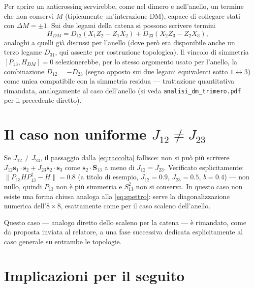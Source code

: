 \documentclass[11pt,a4paper]{article}
\begin{document}
Per aprire un anticrossing servirebbe, come nel dimero e nell'anello, un
termine che non conservi $M$ (tipicamente un'interazione DM), capace di
collegare stati con $\Delta M=\pm1$. Sui due legami della catena si possono
scrivere termini
\[
H_{DM} = D_{12}(X_1Z_2-Z_1X_2) + D_{23}(X_2Z_3-Z_2X_3),
\]
analoghi a quelli già discussi per l'anello (dove però era disponibile
anche un terzo legame $D_{31}$, qui assente per costruzione topologica).
Il vincolo di simmetria $[P_{13},H_{DM}]=0$ selezionerebbe, per lo stesso
argomento usato per l'anello, la combinazione $D_{12}=-D_{23}$ (segno
opposto sui due legami equivalenti sotto $1\leftrightarrow3$) come unica
compatibile con la simmetria residua — trattazione quantitativa rimandata,
analogamente al caso dell'anello (si veda \texttt{analisi\_dm\_trimero.pdf}
per il precedente diretto).

\section{Il caso non uniforme $J_{12}\neq J_{23}$}
\label{sec:non-uniforme}

Se $J_{12}\neq J_{23}$, il passaggio dalla \eqref{eq:raccolta} fallisce: non
si può più scrivere $J_{12}\mathbf s_1\!\cdot\!\mathbf s_2+J_{23}\mathbf
s_2\!\cdot\!\mathbf s_3$ come $\mathbf s_2\cdot\mathbf S_{13}$ a meno di
$J_{12}=J_{23}$. Verificato esplicitamente:
$\|P_{13}HP_{13}^\dagger-H\|=0.8$ (a titolo di esempio, $J_{12}=0.9$,
$J_{23}=0.5$, $b=0.4$) — non nullo, quindi $P_{13}$ non è più simmetria e
$S_{13}^2$ non si conserva. In questo caso non esiste una forma chiusa
analoga alla \eqref{eq:spettro}: serve la diagonalizzazione numerica
dell'$8\times8$, esattamente come per il caso scaleno dell'anello.

Questo caso — analogo diretto dello scaleno per la catena — è rimandato,
come da proposta inviata al relatore, a una fase successiva dedicata
esplicitamente al caso generale su entrambe le topologie.

\section{Implicazioni per il seguito}
\end{document}
